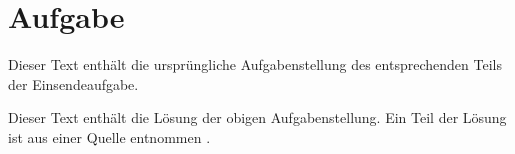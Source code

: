 \chapter{Aufgabe}
\label{ch:01-task}

\begin{center}
    \begin{tcolorbox}[colback=gray!10!white, colframe=gray!75!black, title=Aufgabenstellung]
    Dieser Text enthält die ursprüngliche Aufgabenstellung des entsprechenden Teils der Einsendeaufgabe.
    \end{tcolorbox}
\end{center}

Dieser Text enthält die Lösung der obigen Aufgabenstellung. 
Ein Teil der Lösung ist aus einer Quelle entnommen \cite{000:Reference}.